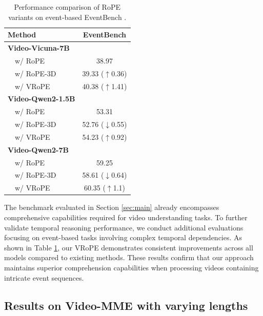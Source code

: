 \documentclass[11pt]{article}
\newcommand{\tableLineColor}{\rowcolor{lightblue}}
\newcommand{\increasingData}[1]{\textcolor{persiangreen}{$\uparrow$#1}}
\newcommand{\decreasingData}[1]{\textcolor{cadmiumred}{$\downarrow$#1}}
\newcommand{\methodname}{VRoPE\xspace}
\begin{document}
\begin{table}[t]
\centering
\caption{Performance comparison of RoPE variants on event-based EventBench \cite{du2024towards}.}
\label{tab:more_benchmarks}
\begin{tabular}{lc}
\toprule
Method & EventBench \\
\midrule
\textbf{Video-Vicuna-7B} \\
\ \ w/ RoPE & 38.97 \\
\ \ w/ RoPE-3D & 39.33 (\increasingData{0.36}) \\
\tableLineColor
\ \ w/ \methodname & 40.38 (\increasingData{1.41}) \\
\midrule
\textbf{Video-Qwen2-1.5B} \\
\ \ w/ RoPE & 53.31 \\
\ \ w/ RoPE-3D & 52.76 (\decreasingData{0.55}) \\
\tableLineColor
\ \ w/ \methodname & 54.23 (\increasingData{0.92}) \\
\midrule
\textbf{Video-Qwen2-7B} \\
\ \ w/ RoPE & 59.25 \\
\ \ w/ RoPE-3D & 58.61 (\decreasingData{0.64}) \\
\tableLineColor
\ \ w/ \methodname & 60.35 (\increasingData{1.1}) \\
\bottomrule
\end{tabular}
\end{table}

The benchmark evaluated in Section \ref{sec:main} already encompasses comprehensive capabilities required for video understanding tasks. To further validate temporal reasoning performance, we conduct additional evaluations focusing on event-based tasks involving complex temporal dependencies. As shown in Table \ref{tab:more_benchmarks}, our \methodname demonstrates consistent improvements across all models compared to existing methods. These results confirm that our approach maintains superior comprehension capabilities when processing videos containing intricate event sequences.

\subsection{Results on Video-MME with varying lengths}
\end{document}
